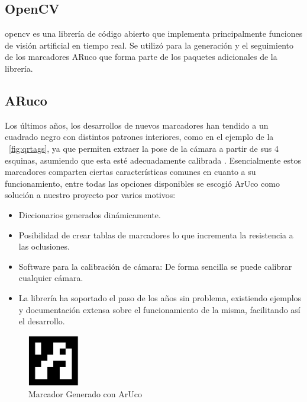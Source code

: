 \subsection{OpenCV}
\acrfull{opencv} es una librería de código abierto que implementa principalmente funciones de visión artificial en tiempo real. Se utilizó para la generación y el seguimiento de los marcadores ARuco que forma parte de los paquetes adicionales de la librería.
\subsection{ARuco}
Los últimos años, los desarrollos de nuevos marcadores han tendido a un cuadrado negro con distintos patrones interiores, como en el ejemplo de la \figurename~\ref{fig:qrtags}, ya que permiten extraer la pose de la cámara a partir de sus 4 esquinas, asumiendo que esta esté adecuadamente calibrada \cite{GarridoJurado2014}. Esencialmente estos marcadores comparten ciertas características comunes en cuanto a su funcionamiento, entre todas las opciones disponibles se escogió ArUco como solución a nuestro proyecto por varios motivos:
\begin{itemize}
    \item Diccionarios generados dinámicamente.
    \item Posibilidad de crear tablas de marcadores lo que incrementa la resistencia a las oclusiones.
    \item Software para la calibración de cámara: De forma sencilla se puede calibrar cualquier cámara.
    \item La librería ha soportado el paso de los años sin problema, existiendo ejemplos y documentación extensa sobre el funcionamiento de la misma, facilitando así el desarrollo.
\end{itemize}

\begin{figure}
  \centering
  \includegraphics[width=0.2\textwidth]{imaxes/qr.png}
  \caption{Marcador Generado con ArUco}
  \label{fig:qr}
\end{figure}


